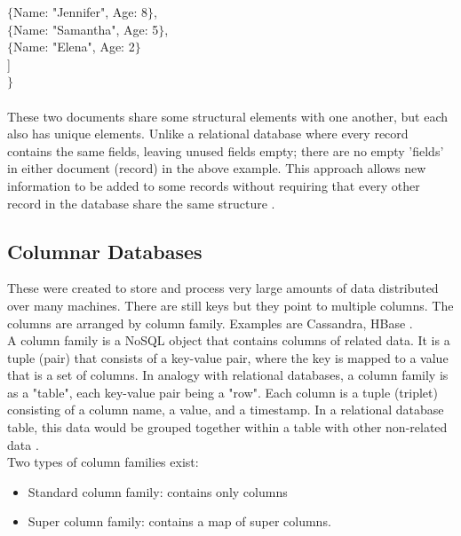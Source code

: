 \hspace*{0.4in} $\{$Name: "Jennifer", Age: 8$\}$,   \\
\hspace*{0.4in} $\{$Name: "Samantha", Age: 5$\}$,   \\
\hspace*{0.4in} $\{$Name: "Elena", Age: 2$\}$   \\
\hspace*{0.4in} ]   \\
$\}$    \\
\\
\hspace*{0.7in} These two documents share some structural elements with one another, but each also has unique elements. Unlike a relational database where every record contains the same fields, leaving unused fields empty; there are no empty 'fields' in either document (record) in the above example. This approach allows new information to be added to some records without requiring that every other record in the database share the same structure \cite{5}.
\subsection{Columnar Databases}
\hspace*{0.7in} These were created to store and process very large amounts of data distributed over many machines. There are still keys but they point to multiple columns. The columns are arranged by column family. Examples are Cassandra, HBase \cite{8}. \\
A column family is a NoSQL object that contains columns of related data. It is a tuple (pair) that consists of a key-value pair, where the key is mapped to a value that is a set of columns. In analogy with relational databases, a column family is as a "table", each key-value pair being a "row". Each column is a tuple (triplet) consisting of a column name, a value, and a timestamp. In a relational database table, this data would be grouped together within a table with other non-related data \cite{6}.\\
Two types of column families exist:
\begin{itemize}
  \item Standard column family: contains only columns
  \item Super column family: contains a map of super columns.
\end{itemize}

